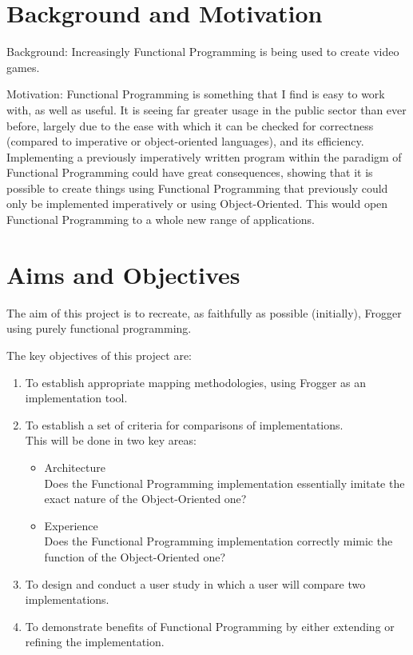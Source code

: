 \documentclass[12pt]{article}
\begin{document}
\maketitle

\section{Background and Motivation}
Background: Increasingly Functional Programming is being used to create video games\cite{ivanperez}.

Motivation: Functional Programming is something that I find is easy to work with, as well as useful.
It is seeing far greater usage in the public sector than ever before, largely due to the ease with which it can be checked for correctness (compared to imperative or object-oriented languages), and its efficiency.\cite{grahamsbook}
Implementing a previously imperatively written program within the paradigm of Functional Programming could have great consequences, showing that it is possible to create things using Functional Programming that previously could only be implemented imperatively or using Object-Oriented.
This would open Functional Programming to a whole new range of applications.

\section{Aims and Objectives}
The aim of this project is to recreate, as faithfully as possible (initially), Frogger using purely functional programming.

The key objectives of this project are:
\begin{enumerate}
  \item To establish appropriate mapping methodologies, using Frogger as an implementation tool.
  \item To establish a set of criteria for comparisons of implementations.\\
        This will be done in two key areas:
    \begin{itemize}
      \item Architecture\\
        Does the Functional Programming implementation essentially imitate the exact nature of the Object-Oriented one?
      \item Experience\\
        Does the Functional Programming implementation correctly mimic the function of the Object-Oriented one?
    \end{itemize}
  \item To design and conduct a user study in which a user will compare two implementations.
  \item To demonstrate benefits of Functional Programming by either extending or refining the implementation.
\end{enumerate}
\end{document}
